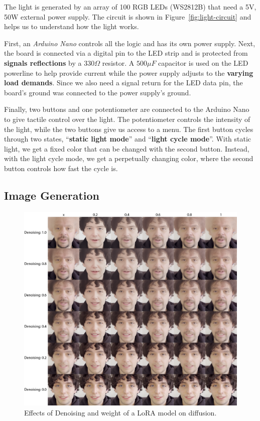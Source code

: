 \documentclass[preprint]{elsarticle}
\begin{document}
The light is generated by an array of 100 RGB LEDs (WS2812B) that need a 5V, 50W external power supply. 
The circuit is shown in Figure~\ref{fig:light-circuit} and helps us to understand how the light works. 

First, an \emph{Arduino Nano} controls all the logic and has its own power supply. 
Next, the board is connected via a digital pin to the LED strip and is protected 
from \textbf{signals reflections} by a $330\Omega$ resistor. 
A $500 \mu F$ capacitor is used on the LED powerline to help provide current 
while the power supply adjusts to the \textbf{varying load demands}. 
Since we also need a signal return for the LED data pin, the board's ground was 
connected to the power supply's ground. 

Finally, two buttons and one potentiometer are connected to the Arduino Nano to give tactile 
control over the light. 
The potentiometer controls the intensity of the light, 
while the two buttons give us access to a menu. 
The first button cycles through two states, ``\textbf{static light mode}'' and ``\textbf{light cycle mode}''. 
With static light, we get a fixed color that can be changed with the second button. Instead, 
with the light cycle mode, we get a perpetually changing color, 
where the second button controls how fast the cycle is.



\subsection{Image Generation}

\begin{figure}[H]
	\centering
	\includegraphics[width=\textwidth, keepaspectratio]{img/project_img/grid-santini.png}
	\caption{Effects of Denoising and weight of a LoRA model on diffusion.}
	\label{fig:grid-santini}
\end{figure}
\end{document}
